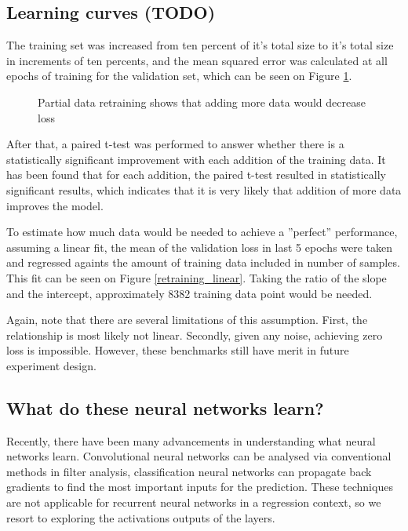 \documentclass[a4paper]{article}
\begin{document}
\subsection{Learning curves (TODO)}

The training set was increased from ten percent of it's total size to it's
total size in increments of ten percents, and the mean squared error
was calculated at all epochs of training for the validation set, which
can be seen on Figure \ref{learning_curve}.

\begin{figure}[t]
  \begin{center}
    \scalebox{0.50}{}
    \caption{Partial data retraining shows that adding more data would
      decrease loss}
      \label{learning_curve}
\end{center}
\end{figure}


After that, a paired t-test was performed to answer whether there is
a statistically significant improvement with each addition of the training data.
It has been found that for each addition, the paired t-test resulted in statistically
significant results, which indicates that it is very likely that addition
of more data improves the model.

To estimate how much data would be needed to achieve a ''perfect'' performance,
assuming a linear fit, the mean of the validation loss in last 5 epochs
were taken and regressed againts the amount of training data included in
number of samples. This fit can be seen on Figure \ref{retraining_linear}.
Taking the ratio of the slope and the intercept, approximately 8382
training data point would be needed.

Again, note that there are several limitations of this assumption. First, the
relationship is most likely not linear. Secondly, given any noise, achieving
zero loss is impossible. However, these benchmarks still have merit in
future experiment design.

\subsection{What do these neural networks learn?} \label{section:visualisation}


Recently, there have been many advancements in understanding what neural networks learn.
Convolutional neural networks can be analysed via conventional methods in filter analysis,
classification neural networks can propagate back gradients to find the most important inputs for
the prediction. These techniques are not applicable for recurrent neural networks in a regression
context, so we resort to exploring the activations outputs of the layers.
\end{document}
